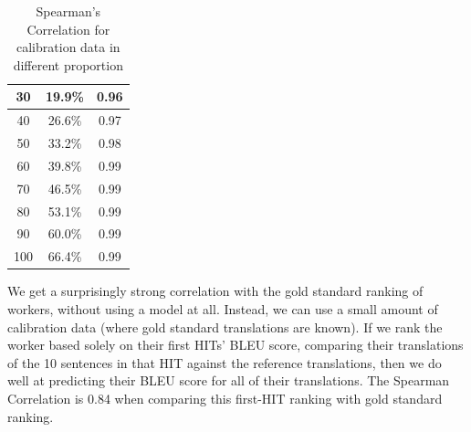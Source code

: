 \documentclass[11pt]{article}
\begin{document}
\begin{table}[h]
\begin{center}
\begin{tabular}{|c|c|c|}
30                                               & 19.9\%                                        & 0.96                                                                               \\ \hline
40                                               & 26.6\%                                        & 0.97                                                                               \\ \hline
50                                               & 33.2\%                                        & 0.98                                                                               \\ \hline
60                                               & 39.8\%                                        & 0.99                                                                               \\ \hline
70                                               & 46.5\%                                        & 0.99                                                                               \\ \hline
80                                               & 53.1\%                                        & 0.99                                                                               \\ \hline
90                                               & 60.0\%                                        & 0.99                                                                               \\ \hline
100                                              & 66.4\%                                        & 0.99                                                                               \\ \hline
\end{tabular}
\end{center}
\caption{\label{spearmansen} Spearman's Correlation for calibration data in different proportion}
\end{table}

We get a surprisingly strong correlation with the gold standard ranking of workers, without using a model at all.  Instead, we can use a small amount of calibration data (where gold standard translations are known). If we rank the worker based solely on their first HITs' BLEU score, comparing their translations of the 10 sentences in that HIT against the reference translations, then we do well at predicting their BLEU score for all of their translations. The Spearman Correlation is 0.84 when comparing this first-HIT ranking with gold standard ranking.  
\end{document}
